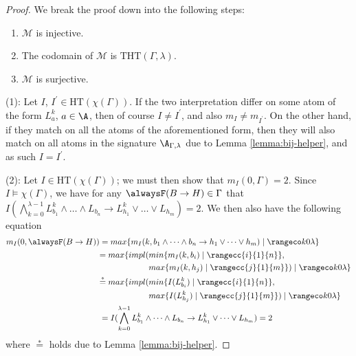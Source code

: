 \begin{proof} We break the proof down into the following steps:
  \begin{enumerate}[label={(\arabic*)}]
    \setlength\itemsep{0.15em}
  \item $\mathcal{M}$ is injective.
  \item The codomain of $\mathcal{M}$ is $\text{THT}(\Gamma,\lambda)$.
  \item $\mathcal{M}$ is surjective.
  \end{enumerate}
    

  (1): Let $I$, $I^{\prime} \in \text{HT}(\chi(\Gamma))$. If the two
  interpretation differ on some atom of the form $L^k_a$, $a \in \A$,
  then of course $I \neq I^{\prime}$, and also
  $m_I \neq m_{I^{\prime}}$. On the other hand, if they match on all
  the atoms of the aforementioned form, then they will also match on
  all atoms in the signature $\A_{\Gamma,\lambda}$ due to Lemma
  \ref{lemma:bij-helper}, and as such $I = I^{\prime}$.

  (2): Let $I \in \text{HT}(\chi(\Gamma))$; we must then show that
  $m_I(0,\Gamma) = 2$. Since $I \models \chi(\Gamma)$, we have for any
  $\tempruleshort \in \Gamma$ that
  $I(\bigwedge_{k=0}^{\lambda-1} L_{b_1}^k \land \dots \land L_{b_n}
  \rightarrow L_{h_1}^k \lor \dots \lor L_{h_m})=2$. We then also have the following equation
  \begin{align*}
  m_I(0,\tempruleshort) &= max\{ m_I(k, \lrulelong ) \mid \kinlambda \}\\
  &\begin{aligned} = max\{ impl(&min\{ m_I(k,b_i) \mid \rangecc{i}{1}{n} \},\\
                               &max\{ m_I(k,h_j) \mid \rangecc{j}{1}{m} \}) \mid \kinlambda \}\end{aligned}\\
  &\begin{aligned} \stackrel{*}{=} max\{ impl(&min\{ I(L^k_{b_i}) \mid \rangecc{i}{1}{n} \},\\
                                &max\{ I(L^k_{h_j}) \mid \rangecc{j}{1}{m} \}) \mid \kinlambda \}\end{aligned}\\
  &= I(\bigwedge_{k=0}^{\lambda-1} L_{b_1}^k \land \dots \land L_{b_n} \rightarrow L_{h_1}^k \lor \dots \lor L_{h_m}) = 2
  \end{align*}
  where $\stackrel{*}=$ holds due to Lemma \ref{lemma:bij-helper}.


\end{proof}
